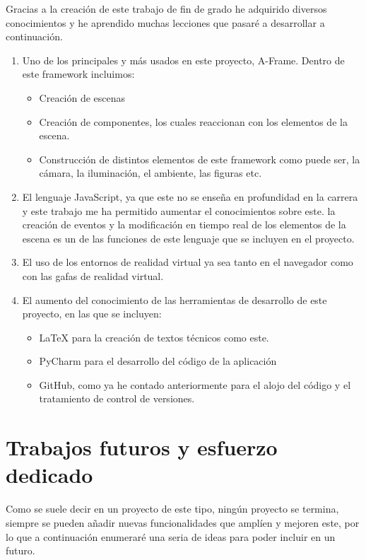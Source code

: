 \documentclass[a4paper, 12pt]{book}
\begin{document}
Gracias a la creación de este trabajo de fin de grado he adquirido diversos conocimientos y he aprendido muchas lecciones que pasaré a desarrollar a continuación.
\begin{enumerate}
  \item Uno de los principales y más usados en este proyecto, A-Frame. Dentro de este framework incluimos:
  \begin{itemize}
      \item Creación de escenas
      \item Creación de componentes, los cuales reaccionan con los elementos de la escena.
      \item Construcción de distintos elementos de este framework como puede ser, la cámara, la iluminación, el ambiente, las figuras etc.
  \end{itemize}
  \item El lenguaje JavaScript, ya que este no se enseña en profundidad en la carrera y este trabajo me ha permitido aumentar el conocimientos sobre este. la creación de eventos y la modificación en tiempo real de los elementos de la escena es un de las funciones de este lenguaje que se incluyen en el proyecto.
  \item El uso de los entornos de realidad virtual ya sea tanto en el navegador como con las gafas de realidad virtual.
  \item El aumento del conocimiento de las herramientas de desarrollo de este proyecto, en las que se incluyen:
  \begin{itemize}
      \item LaTeX para la creación de textos técnicos como este.
      \item PyCharm para el desarrollo del código de la aplicación
      \item GitHub, como ya he contado anteriormente para el alojo del código y el tratamiento de control de versiones.
  \end{itemize}
\end{enumerate}


\section{Trabajos futuros y esfuerzo dedicado}
\label{sec:trabajos_futuros}

Como se suele decir en un proyecto de este tipo, ningún proyecto se termina, siempre se pueden añadir nuevas funcionalidades que amplíen y mejoren este, por lo que a continuación enumeraré una seria de ideas para poder incluir en un futuro.
\end{document}
